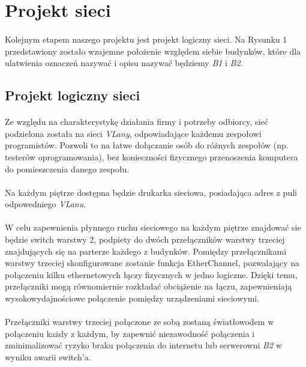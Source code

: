 \newpage
\section{Projekt sieci}
\paragraph{}
Kolejnym etapem naszego projektu jest projekt logiczny sieci. Na Rysunku 1 przedstawiony zostało wzajemne położenie względem siebie budynków, które dla ulatwienia oznaczeń nazywać i opisu nazywać będziemy \textit{B1} i \textit{B2}.

\subsection{Projekt logiczny sieci}
\paragraph{}
Ze względu na charakterystykę działania firmy i potrzeby odbiorcy, sieć podzielona została na sieci \textit{VLany}, odpowiadające każdemu zespołowi programistów. Pozwoli to na łatwe dołączanie osób do różnych zespołów (np. testerów oprogramowania), bez konieczności fizycznego przenoszenia komputera do pomieszczenia danego zespołu.

\paragraph{}
Na każdym piętrze dostępna będzie drukarka sieciowa, posiadająca adres z puli odpowedniego \textit{VLanu}.

\paragraph{}
W celu zapewnienia płynnego ruchu sieciowego na każdym piętrze znajdować sie będzie switch warstwy 2, podpiety do dwóch przełączników warstwy trzeciej znajdujących się na parterze każdego z budynków. Pomiędzy przełącznikami warstwy trzeciej skonfigurowane zostanie funkcja EtherChannel, pozwalający na połączeniu kilku ethernetowych łączy fizycznych w jedno logiczne. Dzięki temu, przełączniki mogą równomiernie rozkładać obciążenie na łączu, zapewnieniają wysokowydajnościowe połączenie pomiędzy urządzeniami sieciowymi.

\paragraph{}
Przełączniki warstwy trzeciej połączone ze sobą zostaną światłowodem w połączeniu każdy z każdym, by zapewnić niezawodność połączenia i zminimalizować ryzyko braku połączenia do internetu lub serwerowni \textit{B2} w wyniku awarii switch'a.

